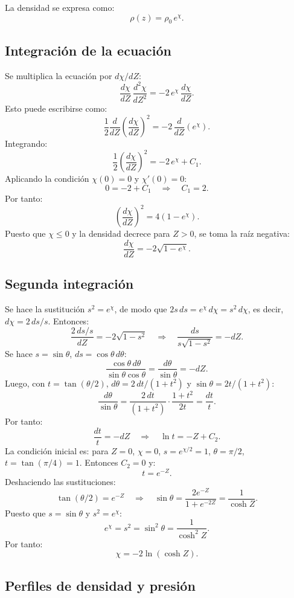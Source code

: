 La densidad se expresa como:
$$
\rho(z) = \rho_0\,e^{\chi}.
$$

\subsection{Integración de la ecuación}

Se multiplica la ecuación por $d\chi/dZ$:
$$
\frac{d\chi}{dZ}\,\frac{d^2\chi}{dZ^2} = -2\,e^{\chi}\,\frac{d\chi}{dZ}.
$$
Esto puede escribirse como:
$$
\frac{1}{2}\frac{d}{dZ}\left(\frac{d\chi}{dZ}\right)^2 = -2\,\frac{d}{dZ}\left(e^{\chi}\right).
$$
Integrando:
$$
\frac{1}{2}\left(\frac{d\chi}{dZ}\right)^2 = -2\,e^{\chi} + C_1.
$$
Aplicando la condición $\chi(0) = 0$ y $\chi'(0) = 0$:
$$
0 = -2 + C_1 \quad \Longrightarrow \quad C_1 = 2.
$$
Por tanto:
$$
\left(\frac{d\chi}{dZ}\right)^2 = 4\left(1 - e^{\chi}\right).
$$
Puesto que $\chi \leq 0$ y la densidad decrece para $Z>0$, se toma la raíz negativa:
$$
\frac{d\chi}{dZ} = -2\sqrt{1 - e^{\chi}}.
$$

\subsection{Segunda integración}

Se hace la sustitución $s^2 = e^{\chi}$, de modo que $2s\,ds = e^{\chi}\,d\chi = s^2\,d\chi$, es decir, $d\chi = 2\,ds/s$. Entonces:
$$
\frac{2\,ds/s}{dZ} = -2\sqrt{1 - s^2} \quad \Longrightarrow \quad \frac{ds}{s\sqrt{1-s^2}} = -dZ.
$$
Se hace $s = \sin\theta$, $ds = \cos\theta\,d\theta$:
$$
\frac{\cos\theta\,d\theta}{\sin\theta\cos\theta} = \frac{d\theta}{\sin\theta} = -dZ.
$$
Luego, con $t = \tan(\theta/2)$, $d\theta = 2\,dt/(1+t^2)$ y $\sin\theta = 2t/(1+t^2)$:
$$
\frac{d\theta}{\sin\theta} = \frac{2\,dt}{(1+t^2)}\cdot\frac{1+t^2}{2t} = \frac{dt}{t}.
$$
Por tanto:
$$
\frac{dt}{t} = -dZ \quad \Longrightarrow \quad \ln t = -Z + C_2.
$$
La condición inicial es: para $Z = 0$, $\chi = 0$, $s = e^{\chi/2} = 1$, $\theta = \pi/2$, $t = \tan(\pi/4) = 1$. Entonces $C_2 = 0$ y:
$$
t = e^{-Z}.
$$
Deshaciendo las sustituciones:
$$
\tan(\theta/2) = e^{-Z} \quad \Longrightarrow \quad \sin\theta = \frac{2e^{-Z}}{1 + e^{-2Z}} = \frac{1}{\cosh Z}.
$$
Puesto que $s = \sin\theta$ y $s^2 = e^{\chi}$:
$$
e^{\chi} = s^2 = \sin^2\theta = \frac{1}{\cosh^2 Z}.
$$
Por tanto:
$$
\chi = -2\ln(\cosh Z).
$$

\subsection{Perfiles de densidad y presión}

